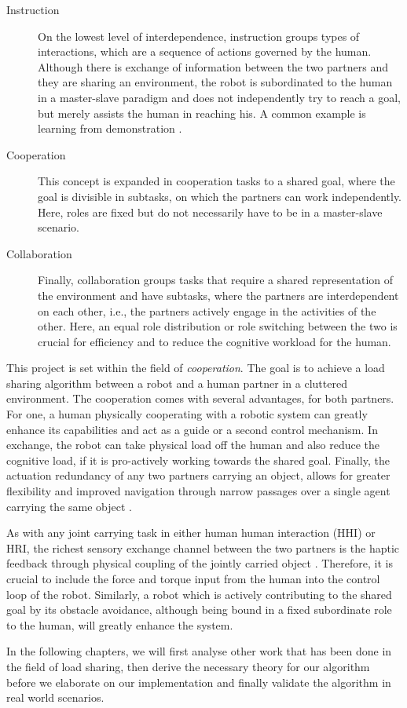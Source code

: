 \begin{description}
\item[Instruction] On the lowest level of interdependence, instruction groups types of interactions, which are a sequence of actions governed by the human. Although there is exchange of information between the two partners and they are sharing an environment, the robot is subordinated to the human in a master-slave paradigm and does not independently try to reach a goal, but merely assists the human in reaching his. A common example is learning from demonstration \citep{argall2009survey}.

\item[Cooperation] This concept is expanded in cooperation tasks to a shared goal, where the goal is divisible in subtasks, on which the partners can work independently. Here, roles are fixed but do not necessarily have to be in a master-slave scenario.

\item[Collaboration] Finally, collaboration groups tasks that require a shared representation of the environment and have subtasks, where the partners are interdependent on each other, i.e., the partners actively engage in the activities of the other. Here, an equal role distribution or role switching between the two is crucial for efficiency and to reduce the cognitive workload for the human.
\end{description}

This project is set within the field of \emph{cooperation}. The goal is to achieve a load sharing algorithm between a robot and a human partner in a cluttered environment. The cooperation comes with several advantages, for both partners. For one, a human physically cooperating with a robotic system can greatly enhance its capabilities and act as a guide or a second control mechanism. In exchange, the robot can take physical load off the human and also reduce the cognitive load, if it is pro-actively 
working towards the shared goal. Finally, the actuation redundancy of any two partners carrying an object, allows for greater flexibility and improved navigation through narrow passages over a single agent carrying the same object \citep{reed2008physical}.

As with any joint carrying task in either human human interaction (HHI) or HRI, the richest sensory exchange channel between the two partners is the haptic feedback through physical coupling of the jointly carried object \citep{reed2006haptic}. Therefore, it is crucial to include the force and torque input from the human into the control loop of the robot. Similarly, a robot which is actively contributing to the shared goal by its obstacle avoidance, although being bound in a fixed subordinate role to the human, will greatly enhance the system.

In the following chapters, we will first analyse other work that has been done in the field of load sharing, then derive the necessary theory for our algorithm before we elaborate on our implementation and finally validate the algorithm in real world scenarios.
